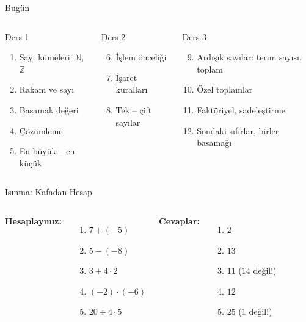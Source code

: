 \documentclass[aspectratio=169,11pt]{beamer}
\begin{document}
\begin{frame}{Bugün}
\begin{columns}[t]
\begin{block}{Ders 1}
\begin{enumerate}
\item Sayı kümeleri: \(\mathbb{N}\), \(\mathbb{Z}\)
\item Rakam ve sayı
\item Basamak değeri
\item Çözümleme
\item En büyük -- en küçük
\end{enumerate}
\end{block}
\begin{block}{Ders 2}
\begin{enumerate}\setcounter{enumi}{5}
\item İşlem önceliği
\item İşaret kuralları
\item Tek -- çift sayılar
\end{enumerate}
\end{block}
\begin{block}{Ders 3}
\begin{enumerate}\setcounter{enumi}{8}
\item Ardışık sayılar: terim sayısı, toplam
\item Özel toplamlar
\item Faktöriyel, sadeleştirme
\item Sondaki sıfırlar, birler basamağı
\end{enumerate}
\end{block}
\end{columns}
\end{frame}

\begin{frame}{Isınma: Kafadan Hesap}
\begin{columns}[t]
\textbf{Hesaplayınız:}
\begin{enumerate}
\item \(7+(-5)\)
\item \(5-(-8)\)
\item \(3+4\cdot 2\)
\item \((-2)\cdot(-6)\)
\item \(20\div 4\cdot 5\)
\end{enumerate}
\pause
\textbf{Cevaplar:}
\begin{enumerate}
\item \(2\)
\item \(13\)
\item \(11\) \quad(\(14\) değil!)
\item \(12\)
\item \(25\) \quad(\(1\) değil!)
\end{enumerate}
\end{columns}
\end{frame}
\end{document}
